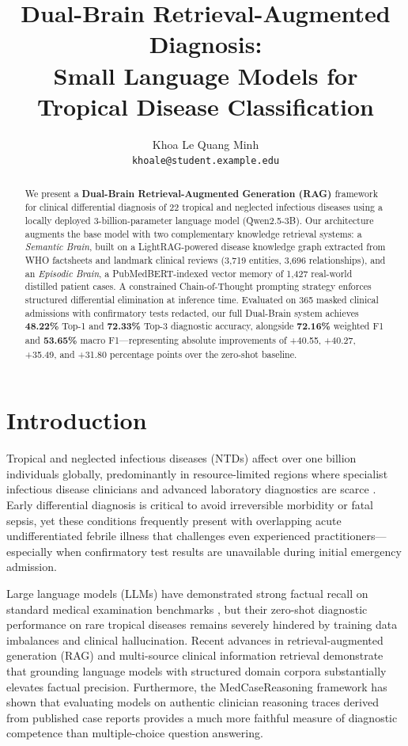 \documentclass{article}
\title{\textbf{Dual-Brain Retrieval-Augmented Diagnosis:\\Small Language Models for Tropical Disease Classification}}
\author{
    Khoa Le Quang Minh \\
    \texttt{khoale@student.example.edu}
}
\begin{document}
\maketitle

\begin{abstract}
We present a \textbf{Dual-Brain Retrieval-Augmented Generation (RAG)} framework for clinical differential diagnosis of 22 tropical and neglected infectious diseases using a locally deployed 3-billion-parameter language model (Qwen2.5-3B). Our architecture augments the base model with two complementary knowledge retrieval systems: a \emph{Semantic Brain}, built on a LightRAG-powered disease knowledge graph extracted from WHO factsheets and landmark clinical reviews (3,719 entities, 3,696 relationships), and an \emph{Episodic Brain}, a PubMedBERT-indexed vector memory of 1,427 real-world distilled patient cases. A constrained Chain-of-Thought prompting strategy enforces structured differential elimination at inference time. Evaluated on 365 masked clinical admissions with confirmatory tests redacted, our full Dual-Brain system achieves \textbf{48.22\%} Top-1 and \textbf{72.33\%} Top-3 diagnostic accuracy, alongside \textbf{72.16\%} weighted F1 and \textbf{53.65\%} macro F1---representing absolute improvements of +40.55, +40.27, +35.49, and +31.80 percentage points over the zero-shot baseline.
\end{abstract}

\section{Introduction}

Tropical and neglected infectious diseases (NTDs) affect over one billion individuals globally, predominantly in resource-limited regions where specialist infectious disease clinicians and advanced laboratory diagnostics are scarce \citep{who2020road}. Early differential diagnosis is critical to avoid irreversible morbidity or fatal sepsis, yet these conditions frequently present with overlapping acute undifferentiated febrile illness that challenges even experienced practitioners---especially when confirmatory test results are unavailable during initial emergency admission.

Large language models (LLMs) have demonstrated strong factual recall on standard medical examination benchmarks \citep{singhal2023large}, but their zero-shot diagnostic performance on rare tropical diseases remains severely hindered by training data imbalances and clinical hallucination. Recent advances in retrieval-augmented generation (RAG) \citep{lewis2020retrieval,gao2023lightrag} and multi-source clinical information retrieval \citep{xiong2024benchmarking} demonstrate that grounding language models with structured domain corpora substantially elevates factual precision. Furthermore, the MedCaseReasoning framework \citep{wu2025medcasereasoning} has shown that evaluating models on authentic clinician reasoning traces derived from published case reports provides a much more faithful measure of diagnostic competence than multiple-choice question answering.
\end{document}
